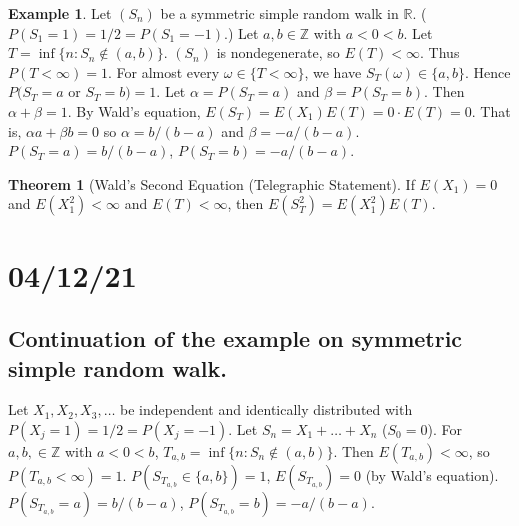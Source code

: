 \documentclass{article}
\newcommand{\R}{\mathbb{R}}
\newcommand{\Z}{\mathbb{Z}}
\theoremstyle{definition}
\newtheorem*{example}{Example}
\newtheorem*{theorem*}{Theorem}
\begin{document}
\begin{example}
Let $(S_n)$ be a symmetric simple random walk in $\R$. ($P(S_1 = 1) = 1/2 = P(S_1 = -1)$.) Let $a, b \in \Z$ with $a < 0 < b$. Let $T = \inf\{n : S_n \notin(a,b)\}$. $(S_n)$ is nondegenerate, so $E(T) < \infty$. Thus $P(T < \infty) = 1$. For almost every $\omega \in \{T < \infty\}$, we have $S_T(\omega) \in \{a, b\}$. Hence $P(S_T = a$ or $S_T = b) = 1$. Let $\alpha = P(S_T = a)$ and $\beta = P(S_T = b)$. Then $\alpha + \beta = 1$. By Wald's equation, $E(S_T) = E(X_1)E(T) = 0 \cdot E(T) = 0$. That is, $\alpha a + \beta b = 0$ so $\alpha = b/(b-a)$ and $\beta = -a/(b-a)$. $P(S_T = a) = b/(b-a)$, $P(S_T = b) = -a/(b-a)$.
\end{example}

\begin{theorem*}[Wald's Second Equation (Telegraphic Statement]
    If $E(X_1) = 0$ and $E(X_1^2) < \infty$ and $E(T) < \infty$, then $E(S_T^2) = E(X_1^2)E(T)$.
\end{theorem*}

\section*{04/12/21}

\subsection*{Continuation of the example on symmetric simple random walk.}
Let $X_1, X_2, X_3, \dots$ be independent and identically distributed with $P(X_j = 1) = 1/2 = P(X_j = -1)$. Let $S_n = X_1 + \dots + X_n$ ($S_0 = 0$). For $a, b, \in \Z$ with $a < 0 < b$, $T_{a,b} = \inf\{n : S_n \notin (a,b)\}$. Then $E(T_{a,b}) < \infty$, so $P(T_{a,b} < \infty) = 1$. $P(S_{T_{a,b}} \in \{a, b\}) = 1$, $E(S_{T_{a,b}}) = 0$ (by Wald's equation). $P(S_{T_{a,b}} = a) = b/(b-a)$, $P(S_{T_{a,b}} = b) = -a/(b-a)$.
\end{document}
